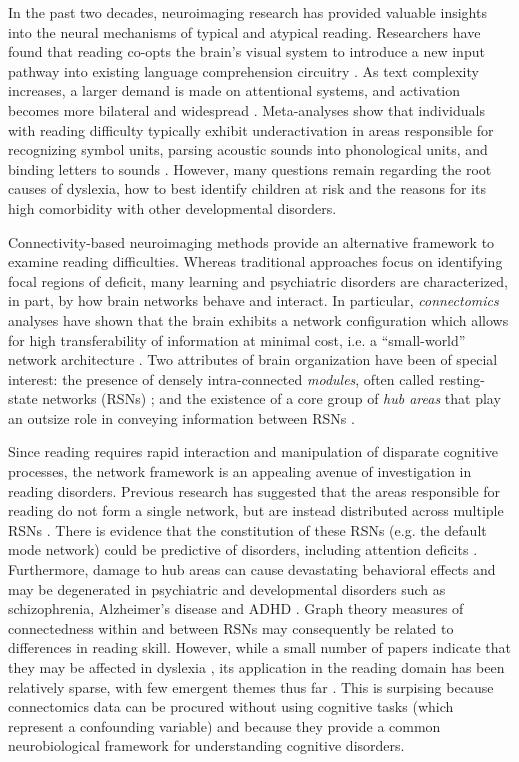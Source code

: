 In the past two decades, neuroimaging research has provided valuable insights into the neural mechanisms of typical and atypical reading. Researchers have found that reading co-opts the brain's visual system to introduce a new input pathway into existing language comprehension circuitry \cite{Jobard2007}. As text complexity increases, a larger demand is made on attentional systems, and activation becomes more bilateral and widespread \cite{Xu2005}.  Meta-analyses show that individuals with reading difficulty typically exhibit underactivation in areas responsible for recognizing symbol units, parsing acoustic sounds into phonological units, and binding letters to sounds \cite{Maisog2008, Richlan2009, Paulesu2014}. However, many questions remain regarding the root causes of dyslexia, how to best identify children at risk and the reasons for its high comorbidity with other developmental disorders. 

Connectivity-based neuroimaging methods provide an alternative framework to examine reading difficulties. Whereas traditional  approaches focus on identifying focal regions of deficit, many learning and psychiatric disorders are characterized, in part, by how brain networks behave and interact. In particular, \textit{connectomics} analyses have shown that the brain exhibits a network configuration which allows for high transferability of information at minimal cost, i.e. a “small-world” network architecture \cite{Bullmore2012}. Two attributes of brain organization have been of special interest: the presence of densely intra-connected \textit{modules}, often called resting-state networks (RSNs) \cite{Sporns2016}; and the existence of a core group of \textit{hub areas} that play an outsize role in conveying information between RSNs \cite{VandenHeuvel2011}. 

Since reading requires rapid interaction and manipulation of disparate cognitive processes, the network framework is an appealing avenue of investigation in reading disorders. Previous research has suggested that the areas responsible for reading do not form a single network, but are instead distributed across multiple RSNs \cite{Vogel2013}. There is evidence that the constitution of these RSNs (e.g. the default mode network) could be predictive of disorders, including attention deficits \cite{Uddin2008}. Furthermore, damage to hub areas can cause devastating behavioral effects \cite{Warren2014} and may be degenerated in psychiatric and developmental disorders such as schizophrenia, Alzheimer's disease and ADHD \cite{Stam2014}. Graph theory measures of connectedness within and between RSNs may consequently be related to differences in reading skill. However, while a small number of papers indicate that they may be affected in dyslexia \cite{Qi2016, Finn2014}, its application in the reading domain has been relatively sparse, with few emergent themes thus far \cite{Cao2016}. This is surpising because connectomics data can be procured without using cognitive tasks (which represent a confounding variable) and because they provide a common neurobiological framework for understanding cognitive disorders.


